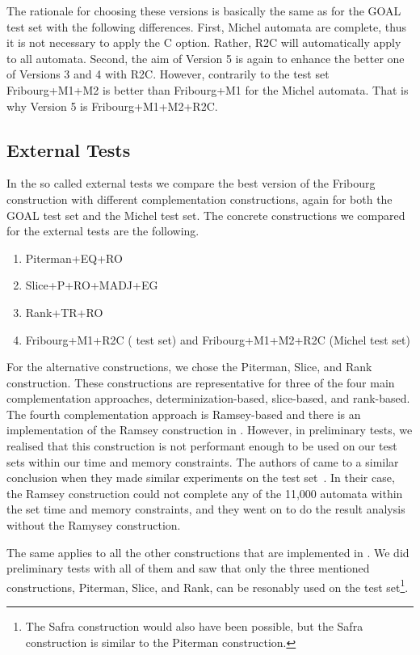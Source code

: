 The rationale for choosing these versions is basically the same as for the GOAL test set with the following differences. First, Michel automata are complete, thus it is not necessary to apply the C option. Rather, R2C will automatically apply to all automata. Second, the aim of Version 5 is again to enhance the better one of Versions 3 and 4 with R2C. However, contrarily to the \goal{} test set Fribourg+M1+M2 is better than Fribourg+M1 for the Michel automata. That is why Version 5 is Fribourg+M1+M2+R2C.


\subsection{External Tests}
In the so called external tests we compare the best version of the Fribourg construction with different complementation constructions, again for both the GOAL test set and the Michel test set. The concrete constructions we compared for the external tests are the following.

\begin{enumerate}
\item Piterman+EQ+RO
\item Slice+P+RO+MADJ+EG
\item Rank+TR+RO
\item Fribourg+M1+R2C (\goal{} test set) and Fribourg+M1+M2+R2C (Michel test set)
\end{enumerate}

For the alternative constructions, we chose the Piterman, Slice, and Rank construction. These constructions are representative for three of the four main complementation approaches, determinization-based, slice-based, and rank-based. The fourth complementation approach is Ramsey-based and there is an implementation of the Ramsey construction in \goal{}. However, in preliminary tests, we realised that this construction is not performant enough to be used on our test sets within our time and memory constraints. The authors of \goal{} came to a similar conclusion when they made similar experiments on the \goal{} test set~\cite{2011_tsai}. In their case, the Ramsey construction could not complete any of the 11,000 automata within the set time and memory constraints, and they went on to do the result analysis without the Ramysey construction.

The same applies to all the other constructions that are implemented in \goal{}. We did preliminary tests with all of them and saw that only the three mentioned constructions, Piterman, Slice, and Rank, can be resonably used on the \goal{} test set\footnote{The Safra construction would also have been possible, but the Safra construction is similar to the Piterman construction.}.

